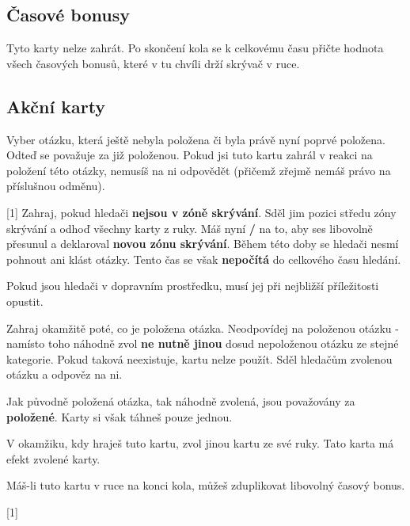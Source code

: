 

\subsection{Časové bonusy}

Tyto karty nelze zahrát. Po skončení kola se k celkovému času přičte hodnota všech časových bonusů, které v tu chvíli drží skrývač v ruce.

\begin{cards}
\end{cards}

\subsection{Akční karty}

\begin{cards}
	 Vyber otázku, která ještě nebyla položena či byla právě nyní poprvé položena. Odteď se považuje za již položenou. Pokud jsi tuto kartu zahrál v reakci na položení této otázky, nemusíš na ni odpovědět (přičemž zřejmě nemáš právo na příslušnou odměnu).

	 Zahraj, pokud hledači \textbf{nejsou v zóně skrývání}. Sděl jim pozici středu zóny skrývání a odhoď všechny karty z ruky. Máš nyní \textbf{\timehidingmove/} na to, aby ses libovolně přesunul a deklaroval \textbf{novou zónu skrývání}. Během této doby se hledači nesmí pohnout ani klást otázky. Tento čas se však \textbf{nepočítá} do celkového času hledání.

	Pokud jsou hledači v dopravním prostředku, musí jej při nejbližší příležitosti opustit.



	 Zahraj okamžitě poté, co je položena otázka. Neodpovídej na položenou otázku - namísto toho náhodně zvol \textbf{ne nutně jinou} dosud nepoloženou otázku ze stejné kategorie. Pokud taková neexistuje, kartu nelze použít. Sděl hledačům zvolenou otázku a odpověz na ni.

	Jak původně položená otázka, tak náhodně zvolená, jsou považovány za \textbf{položené}. Karty si však táhneš pouze jednou.

	 V okamžiku, kdy hraješ tuto kartu, zvol jinou kartu ze své ruky. Tato karta má efekt zvolené karty.

	Máš-li tuto kartu v ruce na konci kola, můžeš zduplikovat libovolný časový bonus.

\end{cards}

